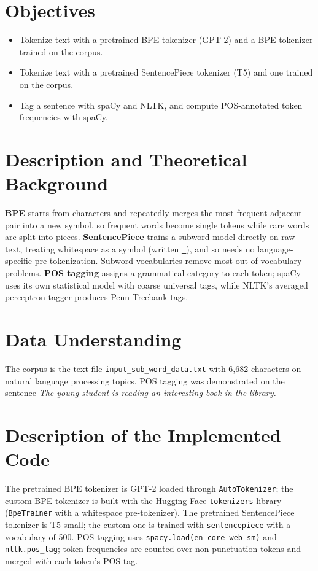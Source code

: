 \documentclass[12pt,a4paper,oneside]{report}
\begin{document}
\section{Objectives}
\begin{itemize}
\item Tokenize text with a pretrained BPE tokenizer (GPT-2) and a BPE tokenizer trained on the corpus.
\item Tokenize text with a pretrained SentencePiece tokenizer (T5) and one trained on the corpus.
\item Tag a sentence with spaCy and NLTK, and compute POS-annotated token frequencies with spaCy.
\end{itemize}

\section{Description and Theoretical Background}
\textbf{BPE} starts from characters and repeatedly merges the most frequent adjacent pair into a new symbol, so frequent words become single tokens while rare words are split into pieces. \textbf{SentencePiece} trains a subword model directly on raw text, treating whitespace as a symbol (written \texttt{▁}), and so needs no language-specific pre-tokenization. Subword vocabularies remove most out-of-vocabulary problems. \textbf{POS tagging} assigns a grammatical category to each token; spaCy uses its own statistical model with coarse universal tags, while NLTK's averaged perceptron tagger produces Penn Treebank tags.


\section{Data Understanding}
The corpus is the text file \texttt{input\_sub\_word\_data.txt} with 6,682 characters on natural language processing topics. POS tagging was demonstrated on the sentence \emph{The young student is reading an interesting book in the library.}


\section{Description of the Implemented Code}
The pretrained BPE tokenizer is GPT-2 loaded through \texttt{AutoTokenizer}; the custom BPE tokenizer is built with the Hugging Face \texttt{tokenizers} library (\texttt{BpeTrainer} with a whitespace pre-tokenizer). The pretrained SentencePiece tokenizer is T5-small; the custom one is trained with \texttt{sentencepiece} with a vocabulary of 500. POS tagging uses \texttt{spacy.load(\textquotesingle{}en\_core\_web\_sm\textquotesingle{})} and \texttt{nltk.pos\_tag}; token frequencies are counted over non-punctuation tokens and merged with each token's POS tag.
\end{document}
